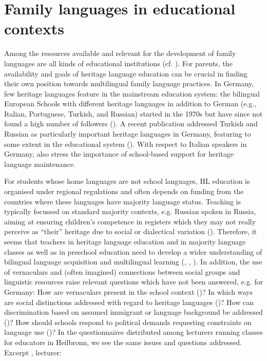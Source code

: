 \documentclass[output=paper,colorlinks,citecolor=brown]{langscibook}
\begin{document}
\section{Family languages in educational contexts} \label{sec:purkathoferetal:5}\largerpage

Among the resources available and relevant for the development of family languages are all kinds of educational institutions (cf. \cite{Polinsky&Kagan2007, Baker2011, Kasstan&al.2018, Montrul2018, Polinsky2018, Gagarina&Milano2021}). For parents, the availability and goals of heritage language education can be crucial in finding their own position towards multilingual family language practices. In Germany, few heritage languages feature in the mainstream education system: the bilingual European Schools with different heritage languages in addition to German (e.g., Italian, Portuguese, Turkish, and Russian) started in the 1970s but have since not found a high number of followers (\cite{Niedrig2001}). A recent publication addressed Turkish and Russian as particularly important heritage languages in Germany, featuring to some extent in the educational system (\cite{Yildiz&al.2017}). With respect to Italian speakers in Germany, \citet{Caloi&Torregrossa2021} also stress the importance of school-based support for heritage language maintenance.

For students whose home languages are not school languages, HL education is organised under regional regulations and often depends on funding from the countries where these languages have majority language status. Teaching is typically focussed on standard majority contexts, e.g. Russian spoken in Russia, aiming at ensuring children’s competence in registers which they may not really perceive as “their” heritage due to social or dialectical variation (\cite{Woerfel&al.2020}). Therefore, it seems that teachers in heritage language education and in majority language classes as well as in preschool education need to develop a wider understanding of bilingual language acquisition and multilingual learning (\cite{Baker2011}, \cite{Krifka&al.2014}, \cite{Seals&Olsen-Reader2019}). In addition, the use of vernaculars and (often imagined) connections between social groups and linguistic resources raise relevant questions which have not been answered, e.g. for Germany: How are vernaculars present in the school context (\cite{Nero&Ahmad2014})? In which ways are social distinctions addressed with regard to heritage languages (\cite{Flores&Rosa2015})? How can discrimination based on assumed immigrant or language background be addressed (\cite{Bonefeld&Dickhaeuser2018})? How should schools respond to political demands requesting constraints on language use (\cite{Wiese&al.2020})?
In the questionnaires distributed among lecturers running classes for educators in Heilbronn, we see the same issues and questions addressed.
Excerpt , lecturer:
\largerpage[2]
\end{document}
